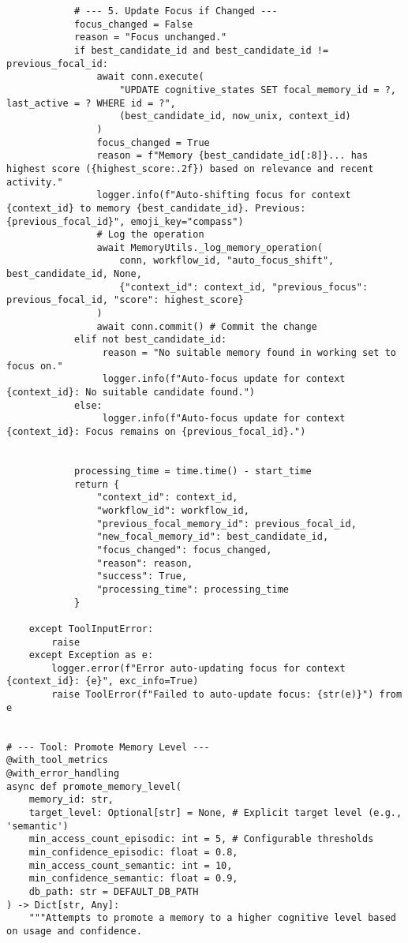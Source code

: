 \documentclass[12pt,a4paper]{article}
\begin{document}
\begin{pageablecode}
\begin{verbatim}
            # --- 5. Update Focus if Changed ---
            focus_changed = False
            reason = "Focus unchanged."
            if best_candidate_id and best_candidate_id != previous_focal_id:
                await conn.execute(
                    "UPDATE cognitive_states SET focal_memory_id = ?, last_active = ? WHERE id = ?",
                    (best_candidate_id, now_unix, context_id)
                )
                focus_changed = True
                reason = f"Memory {best_candidate_id[:8]}... has highest score ({highest_score:.2f}) based on relevance and recent activity."
                logger.info(f"Auto-shifting focus for context {context_id} to memory {best_candidate_id}. Previous: {previous_focal_id}", emoji_key="compass")
                # Log the operation
                await MemoryUtils._log_memory_operation(
                    conn, workflow_id, "auto_focus_shift", best_candidate_id, None,
                    {"context_id": context_id, "previous_focus": previous_focal_id, "score": highest_score}
                )
                await conn.commit() # Commit the change
            elif not best_candidate_id:
                 reason = "No suitable memory found in working set to focus on."
                 logger.info(f"Auto-focus update for context {context_id}: No suitable candidate found.")
            else:
                 logger.info(f"Auto-focus update for context {context_id}: Focus remains on {previous_focal_id}.")


            processing_time = time.time() - start_time
            return {
                "context_id": context_id,
                "workflow_id": workflow_id,
                "previous_focal_memory_id": previous_focal_id,
                "new_focal_memory_id": best_candidate_id,
                "focus_changed": focus_changed,
                "reason": reason,
                "success": True,
                "processing_time": processing_time
            }

    except ToolInputError:
        raise
    except Exception as e:
        logger.error(f"Error auto-updating focus for context {context_id}: {e}", exc_info=True)
        raise ToolError(f"Failed to auto-update focus: {str(e)}") from e


# --- Tool: Promote Memory Level ---
@with_tool_metrics
@with_error_handling
async def promote_memory_level(
    memory_id: str,
    target_level: Optional[str] = None, # Explicit target level (e.g., 'semantic')
    min_access_count_episodic: int = 5, # Configurable thresholds
    min_confidence_episodic: float = 0.8,
    min_access_count_semantic: int = 10,
    min_confidence_semantic: float = 0.9,
    db_path: str = DEFAULT_DB_PATH
) -> Dict[str, Any]:
    """Attempts to promote a memory to a higher cognitive level based on usage and confidence.


\end{verbatim}
\end{pageablecode}
\end{document}
